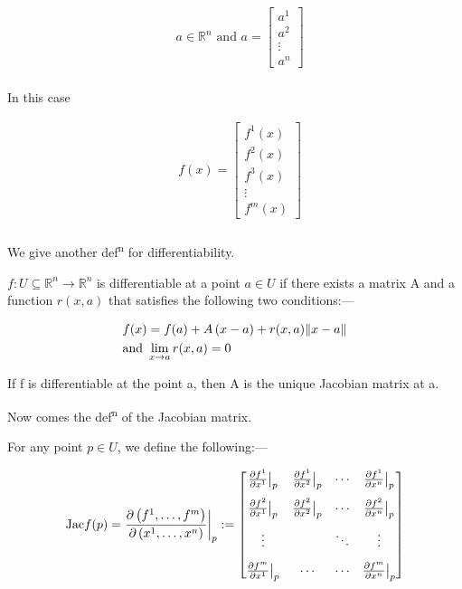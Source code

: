 \begin{align*}
    & a \in \mathbb{R}^n \text{ and } a = \begin{bmatrix} a^1 \\ a^2 \\ \vdots \\ a^n \end{bmatrix} \\
\end{align*}

In this case

\begin{align*}
    & f(x) = \begin{bmatrix} f^1(x) \\ f^2(x) \\ f^3(x) \\ \vdots \\ f^m(x) \end{bmatrix} \\
\end{align*}

We give another def\textsuperscript{n} for differentiability.

$ f: U \subseteq \mathbb{R}^n \longrightarrow \mathbb{R}^n$ is differentiable at a point $ a \in U$ if there exists a matrix A and a function $ r(x,a)$ that satisfies the following two conditions:—

\begin{align*}
    & f(x) = f(a) + A \left(  x-a \right) + r(x,a) \| x-a \| \\
    & \text{and } \displaystyle\lim_{x \to a} r(x,a) = 0 \\
\end{align*}

If f is differentiable at the point a, then A is the unique Jacobian matrix at a.

Now comes the def\textsuperscript{n} of the Jacobian matrix.

For any point $ p \in U$, we define the following:—

\begin{align*}
    & \text{Jac} f(p) = \frac{\partial \left(  f^1, \ldots, f^m \right)}{\partial \left(  x^1, \ldots, x^n \right)} \bigg|_p :=
    \begin{bmatrix}
        \frac{\partial f^1}{\partial x^1} \big|_p & \frac{\partial f^1}{\partial x^2} \big|_p & \cdots & \frac{\partial f^1}{\partial x^n} \big|_p \\[2ex]
        \frac{\partial f^2}{\partial x^1} \big|_p & \frac{\partial f^2}{\partial x^2} \big|_p & \cdots & \frac{\partial f^2}{\partial x^n} \big|_p \\[2ex]
        \vdots & & \ddots & \vdots \\[2ex]
        \frac{\partial f^m}{\partial x^1} \big|_p & \cdots & \cdots & \frac{\partial f^m}{\partial x^n} \big|_p
    \end{bmatrix} \\
\end{align*}

